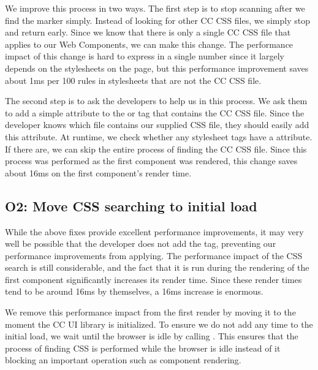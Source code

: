 We improve this process in two ways. The first step is to stop scanning after we find the marker simply. Instead of looking for other CC CSS files, we simply stop and return early. Since we know that there is only a single CC CSS file that applies to our Web Components, we can make this change. The performance impact of this change is hard to express in a single number since it largely depends on the stylesheets on the page, but this performance improvement saves about 1ms per 100 rules in stylesheets that are not the CC CSS file.

The second step is to ask the developers to help us in this process. We ask them to add a simple  attribute to the  or  tag that contains the CC CSS file. Since the developer knows which file contains our supplied CSS file, they should easily add this attribute. At runtime, we check whether any stylesheet tags have a  attribute. If there are, we can skip the entire process of finding the CC CSS file. Since this process was performed as the first component was rendered, this change saves about 16ms on the first component's render time.

\subsection{O2: Move CSS searching to initial load}\label{sec:case-study:css-initial-load}
While the above fixes provide excellent performance improvements, it may very well be possible that the developer does not add the  tag, preventing our performance improvements from applying. The performance impact of the CSS search is still considerable, and the fact that it is run during the rendering of the first component significantly increases its render time. Since these render times tend to be around 16ms by themselves, a 16ms increase is enormous.

We remove this performance impact from the first render by moving it to the moment the CC UI library is initialized. To ensure we do not add any time to the initial load, we wait until the browser is idle by calling . This ensures that the process of finding CSS is performed while the browser is idle instead of it blocking an important operation such as component rendering.
